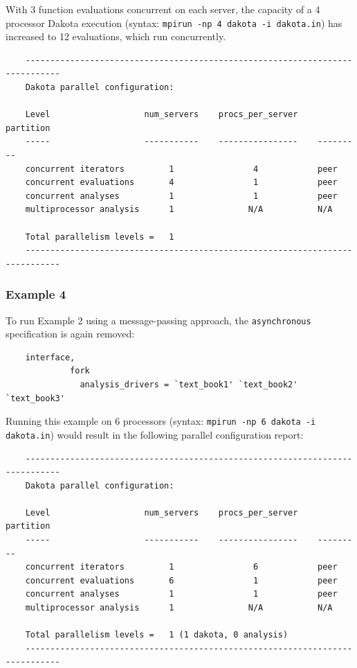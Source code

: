 With 3 function evaluations concurrent on each server, the capacity of
a 4 processor Dakota execution (syntax: \texttt{mpirun -np 4 dakota -i
  dakota.in}) has increased to 12 evaluations, which run concurrently.

\begin{small}
\begin{verbatim}
    -----------------------------------------------------------------------------
    Dakota parallel configuration:

    Level                   num_servers    procs_per_server    partition
    -----                   -----------    ----------------    ---------
    concurrent iterators         1                4            peer
    concurrent evaluations       4                1            peer
    concurrent analyses          1                1            peer
    multiprocessor analysis      1               N/A           N/A

    Total parallelism levels =   1
    -----------------------------------------------------------------------------
\end{verbatim}
\end{small}

\subsubsection{Example 4}\label{parallel:spec:multi:example4}

To run Example 2 using a message-passing approach, the
\texttt{asynchronous} specification is again removed:
\begin{small}
\begin{verbatim}
    interface,
             fork
               analysis_drivers = `text_book1' `text_book2' `text_book3'
\end{verbatim}
\end{small}

Running this example on 6 processors (syntax: \texttt{mpirun -np 6
  dakota -i dakota.in}) would result in the following parallel
configuration report:
\begin{small}
\begin{verbatim}
    -----------------------------------------------------------------------------
    Dakota parallel configuration:

    Level                   num_servers    procs_per_server    partition
    -----                   -----------    ----------------    ---------
    concurrent iterators         1                6            peer
    concurrent evaluations       6                1            peer 
    concurrent analyses          1                1            peer
    multiprocessor analysis      1               N/A           N/A

    Total parallelism levels =   1 (1 dakota, 0 analysis)
    -----------------------------------------------------------------------------
\end{verbatim}
\end{small}

